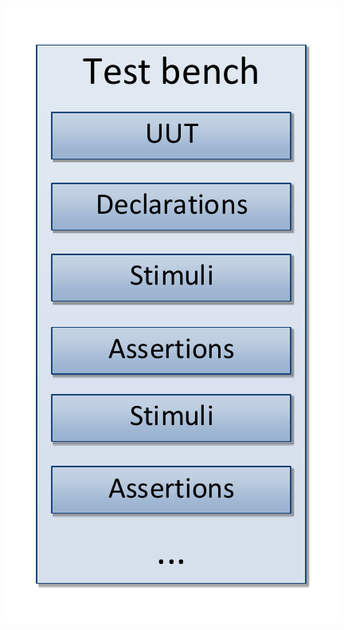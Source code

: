 \documentclass[british,10pt]{beamer}
\begin{document}
\begin{frame}
\begin{columns}
\includegraphics[width=\textwidth]{images/TB.pdf}
\end{columns}
\end{frame}

\end{document}
